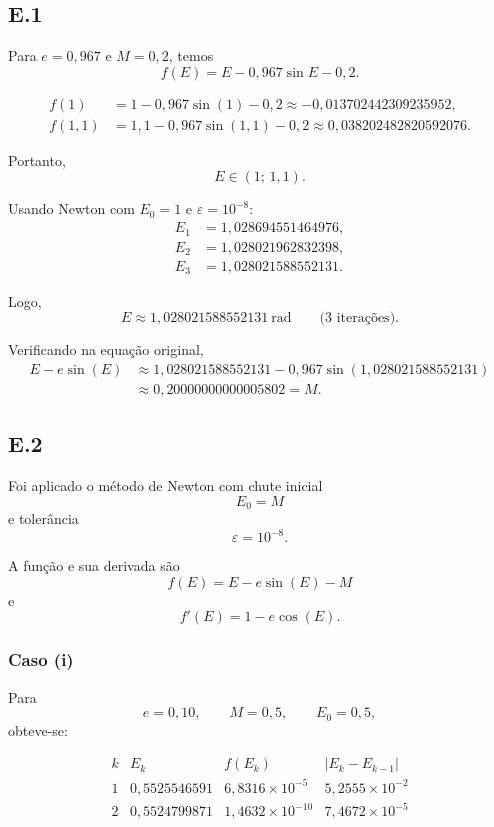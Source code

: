 \documentclass[
	12pt,				%
	openright,			%
	a4paper,			%
	english,			%
	french,				%
	spanish,			%
	brazil,				%
	]{abntex2}
\begin{document}
\subsection*{E.1}

Para $e=0{,}967$ e $M=0{,}2$, temos
\[
f(E)=E-0{,}967\sin E-0{,}2.
\]

\begin{align*}
f(1)
&=1-0{,}967\sin(1)-0{,}2
\approx -0{,}013702442309235952,\\
f(1{,}1)
&=1{,}1-0{,}967\sin(1{,}1)-0{,}2
\approx 0{,}038202482820592076.
\end{align*}

Portanto,
\[
E\in(1;\,1{,}1).
\]

Usando Newton com $E_0=1$ e $\varepsilon=10^{-8}$:
\begin{align*}
E_1 &= 1{,}028694551464976,\\
E_2 &= 1{,}028021962832398,\\
E_3 &= 1{,}028021588552131.
\end{align*}

Logo,
\[
\boxed{E\approx 1{,}028021588552131\ \text{rad}}
\qquad\text{(3 iterações).}
\]

Verificando na equação original,
\begin{align*}
E-e\sin(E)
&\approx 1{,}028021588552131
-0{,}967\sin(1{,}028021588552131)\\
&\approx 0{,}20000000000005802=M.
\end{align*}

\subsection*{E.2}

Foi aplicado o método de Newton com chute inicial
\[
E_0=M
\]
e tolerância
\[
\varepsilon=10^{-8}.
\]

A função e sua derivada são
\[
f(E)=E-e\sin(E)-M
\]
e
\[
f'(E)=1-e\cos(E).
\]

\subsubsection*{Caso (i)}

Para
\[
e=0,10,
\qquad
M=0,5,
\qquad
E_0=0,5,
\]
obteve-se:

\[
\begin{array}{c|c|c|c}
k & E_k & f(E_k) & |E_k-E_{k-1}| \\ \hline
1 & 0,5525546591 & 6,8316\times10^{-5} & 5,2555\times10^{-2} \\
2 & 0,5524799871 & 1,4632\times10^{-10} & 7,4672\times10^{-5}
\end{array}
\]
\end{document}
